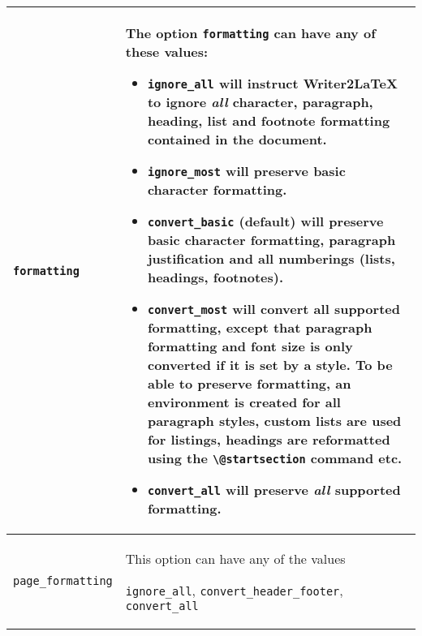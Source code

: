 \documentclass{article}
\newcommand\textstyleSourceText[1]{\texttt{\textmd{#1}}}
\newcommand\liststyleLxii{%
\renewcommand\labelitemi{${\bullet}$}
\renewcommand\labelitemii{${\circ}$}
\renewcommand\labelitemiii{${\blacksquare}$}
\renewcommand\labelitemiv{${\bullet}$}
}
\begin{document}
\begin{center}
\begin{tabular}{|m{3.8479998cm}|m{12.765cm}|}

\hline
{\mdseries \textstyleSourceText{formatting}} &
{\mdseries The option \textstyleSourceText{formatting} can have any of these values:}

\liststyleLxii
\begin{itemize}
\item \textstyleSourceText{ignore\_all} will instruct Writer2LaTeX to ignore \emph{all} character, paragraph, heading, list and footnote formatting contained in the document.
\item \textstyleSourceText{ignore\_most} will preserve basic character formatting.
\item \textstyleSourceText{convert\_basic} (default) will preserve basic character formatting, paragraph justification and all numberings (lists, headings, footnotes).
\item \textstyleSourceText{convert\_most} will convert all supported formatting, except that paragraph formatting and font size is only converted if it is set by a style. To be able to preserve formatting, an environment is created for all paragraph styles, custom lists are used for listings, headings are reformatted using the \textstyleSourceText{{\textbackslash}@startsection} command etc.
\item \textstyleSourceText{convert\_all} will preserve \emph{all} supported formatting.
\end{itemize}
\\\hline
{\mdseries \textstyleSourceText{page\_formatting}} &
{\mdseries This option can have any of the values}

{\mdseries \textstyleSourceText{ignore\_all}, \textstyleSourceText{convert\_header\_footer}, \textstyleSourceText{convert\_all}}


\end{tabular}
\end{center}
\end{document}
